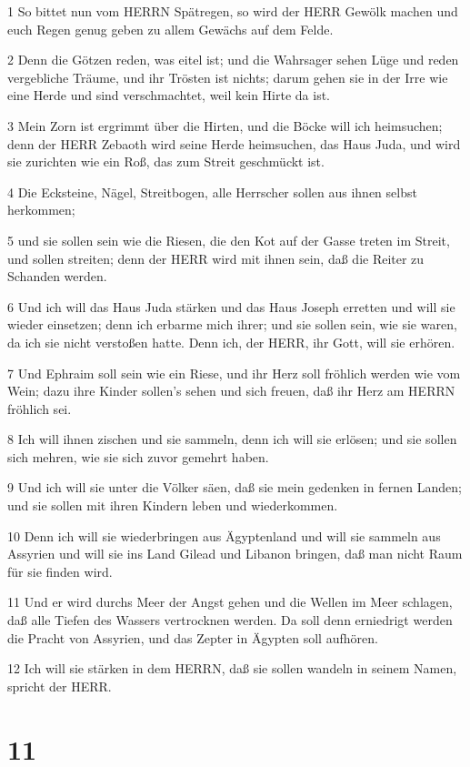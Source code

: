 \par 1 So bittet nun vom HERRN Spätregen, so wird der HERR Gewölk machen und euch Regen genug geben zu allem Gewächs auf dem Felde.
\par 2 Denn die Götzen reden, was eitel ist; und die Wahrsager sehen Lüge und reden vergebliche Träume, und ihr Trösten ist nichts; darum gehen sie in der Irre wie eine Herde und sind verschmachtet, weil kein Hirte da ist.
\par 3 Mein Zorn ist ergrimmt über die Hirten, und die Böcke will ich heimsuchen; denn der HERR Zebaoth wird seine Herde heimsuchen, das Haus Juda, und wird sie zurichten wie ein Roß, das zum Streit geschmückt ist.
\par 4 Die Ecksteine, Nägel, Streitbogen, alle Herrscher sollen aus ihnen selbst herkommen;
\par 5 und sie sollen sein wie die Riesen, die den Kot auf der Gasse treten im Streit, und sollen streiten; denn der HERR wird mit ihnen sein, daß die Reiter zu Schanden werden.
\par 6 Und ich will das Haus Juda stärken und das Haus Joseph erretten und will sie wieder einsetzen; denn ich erbarme mich ihrer; und sie sollen sein, wie sie waren, da ich sie nicht verstoßen hatte. Denn ich, der HERR, ihr Gott, will sie erhören.
\par 7 Und Ephraim soll sein wie ein Riese, und ihr Herz soll fröhlich werden wie vom Wein; dazu ihre Kinder sollen's sehen und sich freuen, daß ihr Herz am HERRN fröhlich sei.
\par 8 Ich will ihnen zischen und sie sammeln, denn ich will sie erlösen; und sie sollen sich mehren, wie sie sich zuvor gemehrt haben.
\par 9 Und ich will sie unter die Völker säen, daß sie mein gedenken in fernen Landen; und sie sollen mit ihren Kindern leben und wiederkommen.
\par 10 Denn ich will sie wiederbringen aus Ägyptenland und will sie sammeln aus Assyrien und will sie ins Land Gilead und Libanon bringen, daß man nicht Raum für sie finden wird.
\par 11 Und er wird durchs Meer der Angst gehen und die Wellen im Meer schlagen, daß alle Tiefen des Wassers vertrocknen werden. Da soll denn erniedrigt werden die Pracht von Assyrien, und das Zepter in Ägypten soll aufhören.
\par 12 Ich will sie stärken in dem HERRN, daß sie sollen wandeln in seinem Namen, spricht der HERR.

\chapter{11}

